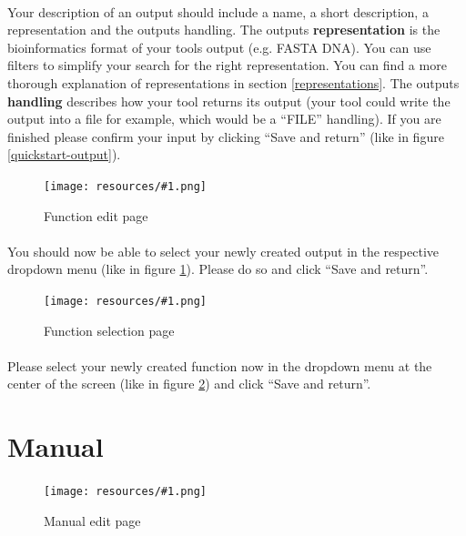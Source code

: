 \documentclass[a4paper,10pt]{book}
\newcommand{\bigpic}[1]{\texttt{[image: resources/\#1.png]}}
\begin{document}
\paragraph{} Your description of an output should include a name, a short description, a representation and the outputs handling. The outputs \textbf{representation} is the bioinformatics format of your tools output (e.g. FASTA DNA). You can use filters to simplify your search for the right representation. You can find a more thorough explanation of representations in section \ref{representations}. The outputs \textbf{handling} describes how your tool returns its output (your tool could write the output into a file for example, which would be a ``FILE'' handling). If you are finished please confirm your input by clicking ``Save and return'' (like in figure \ref{quickstart-output}).

\begin{figure}
 \bigpic{quickstart-function2}
\caption{Function edit page}
\label{quickstart-function2}
\end{figure}

\paragraph{} You should now be able to select your newly created output in the respective dropdown menu (like in figure \ref{quickstart-function2}). Please do so and click ``Save and return''.

\begin{figure}
 \bigpic{quickstart-functionSelection2}
\caption{Function selection page}
\label{quickstart-functionSelection2}
\end{figure}

\paragraph{} Please select your newly created function now in the dropdown menu at the center of the screen (like in figure \ref{quickstart-functionSelection2}) and click ``Save and return''.

\section{Manual}

\begin{figure}
 \bigpic{quickstart-manual}
\caption{Manual edit page}
\label{quickstart-manual}
\end{figure}
\end{document}
